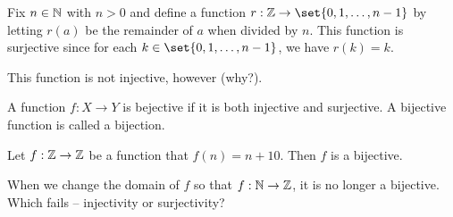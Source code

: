\begin{example}
    Fix $n \in \mathbb{N}$ with $n >0$ and define a function 
    $r: \Z \to \set{0, 1, \dots, n -1}$ by letting
    $r(a)$ be the remainder of $a$ when divided by $n$.
    This function is surjective since for each $k \in \set{0, 1, \dots, n-1}$,
    we have $r(k) = k$.

    This function is not injective, however (why?).
\end{example}

\begin{definition}[Bijection]
    A function $f:X\to Y$ is bejective if it is both injective and surjective.
    A bijective function is called a bijection.
\end{definition}

\begin{example}
    Let $f: \mathbb{Z} \to \mathbb{Z}$ be a function that $f(n) = n +10$.
    Then $f$ is a bijective.

    When we change the domain of $f$ so that $f: \mathbb{N} \to \mathbb{Z}$, it is no longer
    a bijective. Which fails -- injectivity or surjectivity?
\end{example}







